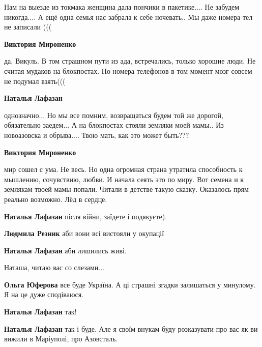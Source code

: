  
 
 
 
 

\qqSecCmt


Нам на выезде из токмака женщина дала пончики в пакетике.... Не забудем
никогда.... А ещё одна семья нас забрала к себе ночевать.. Мы даже номера тел
не записали (((

\begin{itemize} %
\textbf{Виктория Мироненко} 

да, Викуль. В том страшном пути из ада, встречались, только хорошие люди. Не
считая мудаков на блокпостах. Но номера телефонов в том момент мозг совсем не
подумал взять(((

\textbf{Наталья Лафазан} 

однозначно... Но мы все помним, возвращаться будем той же дорогой, обязательно
заедем... А на блокпостах стояли земляки моей мамы.. Из новоазовска и
обрыва.... Твою мать, как это может быть??? 🤦🤦🤦

\textbf{Виктория Мироненко} 

мир сошел с ума. Не весь. Но одна огромная страна утратила способность к
мышлению, сочувствию, любви. И начала сеять это по миру. Вот семена и к
землякам твоей мамы попали. Читали в детстве такую сказку. Оказалось прям
реально возможно. Лёд в сердце.

\textbf{Наталья Лафазан} після війни, заїдете і подякуєте).

\textbf{Людмила Резник} аби вони всі вистояли у окупації

\textbf{Наталья Лафазан} аби лишились живі.

\end{itemize} %


Наташа, читаю вас со слезами...

\begin{itemize} %
\textbf{Ольга Юферова} все буде Україна. А ці страшні згадки залишаться у минулому. Я на це дуже сподіваюся.

\textbf{Наталья Лафазан} так!

\textbf{Наталья Лафазан} так і буде. Але я своїм внукам буду розказувати про вас як ви вижили в Маріуполі, про Азовсталь.
\end{itemize} %

